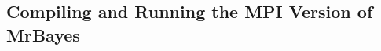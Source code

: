 \documentclass[12pt]{book}
\newcommand{\ttt}[1]{\texttt{#1}}
\newcommand{\tb}[1]{\ttt{\textbf{#1}}}
\begin{document}

\subsection{Compiling and Running the MPI Version of MrBayes}
\label{MPIversion}
\end{document}

